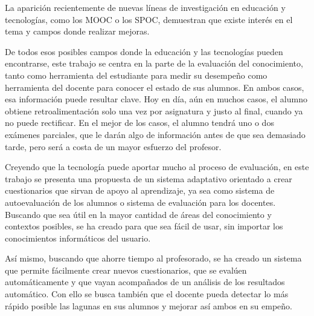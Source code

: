 La aparición recientemente de nuevas líneas de investigación en educación y tecnologías, como los \acrshort{MOOC} o los \acrshort{SPOC}, demuestran que existe interés en el tema y campos donde realizar mejoras.

De todos esos posibles campos donde la educación y las tecnologías pueden encontrarse, este trabajo se centra en la parte de la evaluación del conocimiento, tanto como herramienta del estudiante para medir su desempeño como herramienta del docente para conocer el estado de sus alumnos. En ambos casos, esa información puede resultar clave. Hoy en día, aún en muchos casos, el alumno obtiene retroalimentación solo una vez por asignatura y justo al final, cuando ya no puede rectificar. En el mejor de los casos, el alumno tendrá uno o dos exámenes parciales, que le darán algo de información antes de que sea demasiado tarde, pero será a costa de un mayor esfuerzo del profesor.

Creyendo que la tecnología puede aportar mucho al proceso de evaluación, en este trabajo se presenta una propuesta de un sistema adaptativo orientado a crear cuestionarios que sirvan de apoyo al aprendizaje, ya sea como sistema de autoevaluación de los alumnos o sistema de evaluación para los docentes. 
Buscando que sea útil en la mayor cantidad de áreas del conocimiento y  contextos posibles, se ha creado para que sea fácil de usar, sin importar los conocimientos informáticos del usuario. 

Así mismo, buscando que ahorre tiempo al profesorado, se ha creado un sistema que permite fácilmente crear nuevos cuestionarios, que se evalúen automáticamente y que vayan acompañados de un análisis de los resultados automático. Con ello se busca también que el docente pueda detectar lo más rápido posible las lagunas en sus alumnos y mejorar así ambos en su empeño.




